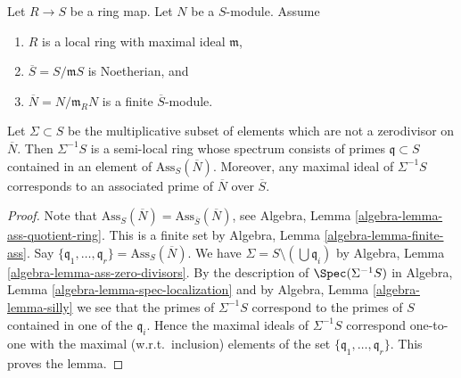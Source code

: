 \begin{lemma}
\label{lemma-homothety-spectrum}
Let $R \to S$ be a ring map.
Let $N$ be a $S$-module.
Assume
\begin{enumerate}
\item $R$ is a local ring with maximal ideal $\mathfrak m$,
\item $\overline{S} = S/\mathfrak m S$ is Noetherian, and
\item $\overline{N} = N/\mathfrak m_R N$ is a finite $\overline{S}$-module.
\end{enumerate}
Let $\Sigma \subset S$ be the multiplicative subset of elements which are not
a zerodivisor on $\overline{N}$. Then $\Sigma^{-1}S$ is a semi-local ring
whose spectrum consists of primes $\mathfrak q \subset S$ contained in an
element of $\text{Ass}_S(\overline{N})$. Moreover, any maximal
ideal of $\Sigma^{-1}S$ corresponds to an associated prime of
$\overline{N}$ over $\overline{S}$.
\end{lemma}

\begin{proof}
Note that
$\text{Ass}_S(\overline{N}) = \text{Ass}_{\overline{S}}(\overline{N})$, see
Algebra, Lemma \ref{algebra-lemma-ass-quotient-ring}.
This is a finite set by
Algebra, Lemma \ref{algebra-lemma-finite-ass}.
Say $\{\mathfrak q_1, \ldots, \mathfrak q_r\} = \text{Ass}_S(\overline{N})$.
We have $\Sigma = S \setminus (\bigcup \mathfrak q_i)$ by
Algebra, Lemma \ref{algebra-lemma-ass-zero-divisors}.
By the description of $\Spec(\Sigma^{-1}S)$ in
Algebra, Lemma \ref{algebra-lemma-spec-localization}
and by
Algebra, Lemma \ref{algebra-lemma-silly}
we see that the primes of $\Sigma^{-1}S$ correspond to the primes of
$S$ contained in one of the $\mathfrak q_i$.
Hence the maximal ideals of $\Sigma^{-1}S$ correspond one-to-one with the
maximal (w.r.t.\ inclusion) elements of the set
$\{\mathfrak q_1, \ldots, \mathfrak q_r\}$. This proves the lemma.
\end{proof}
